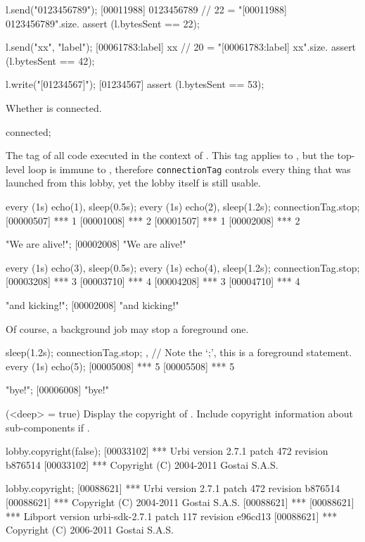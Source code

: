 \begin{urbiscriptapi}
\begin{urbiscript}
l.send("0123456789");
[00011988] 0123456789
// 22 = "[00011988] 0123456789\n".size.
assert (l.bytesSent == 22);

l.send("xx", "label");
[00061783:label] xx
// 20 = "[00061783:label] xx\n".size.
assert (l.bytesSent == 42);

l.write("[01234567]\n");
[01234567]
assert (l.bytesSent == 53);
\end{urbiscript}


\item[connected]
  Whether \this is connected.
\begin{urbiassert}
connected;
\end{urbiassert}


\item[connectionTag] The tag of all code executed in the context of \this.
  This tag applies to \this, but the top-level loop is immune to
  , therefore \lstinline|connectionTag| controls every
  thing that was launched from this lobby, yet the lobby itself is still
  usable.
\begin{urbiscript}
every (1s) echo(1), sleep(0.5s); every (1s) echo(2),
sleep(1.2s);
connectionTag.stop;
[00000507] *** 1
[00001008] *** 2
[00001507] *** 1
[00002008] *** 2

"We are alive!";
[00002008] "We are alive!"

every (1s) echo(3), sleep(0.5s); every (1s) echo(4),
sleep(1.2s);
connectionTag.stop;
[00003208] *** 3
[00003710] *** 4
[00004208] *** 3
[00004710] *** 4

"and kicking!";
[00002008] "and kicking!"
\end{urbiscript}

  Of course, a background job may stop a foreground one.
\begin{urbiscript}
{ sleep(1.2s); connectionTag.stop; },
// Note the `;', this is a foreground statement.
every (1s) echo(5);
[00005008] *** 5
[00005508] *** 5

"bye!";
[00006008] "bye!"
\end{urbiscript}


\item[copyright](<deep> = true)%
  Display the copyright of \usdk.  Include copyright information
  about sub-components if .
\begin{urbiscript}
lobby.copyright(false);
[00033102] *** Urbi version 2.7.1 patch 472 revision b876514
[00033102] *** Copyright (C) 2004-2011 Gostai S.A.S.

lobby.copyright;
[00088621] *** Urbi version 2.7.1 patch 472 revision b876514
[00088621] *** Copyright (C) 2004-2011 Gostai S.A.S.
[00088621] ***
[00088621] *** Libport version urbi-sdk-2.7.1 patch 117 revision e96cd13
[00088621] *** Copyright (C) 2006-2011 Gostai S.A.S.
\end{urbiscript}



\end{urbiscriptapi}
